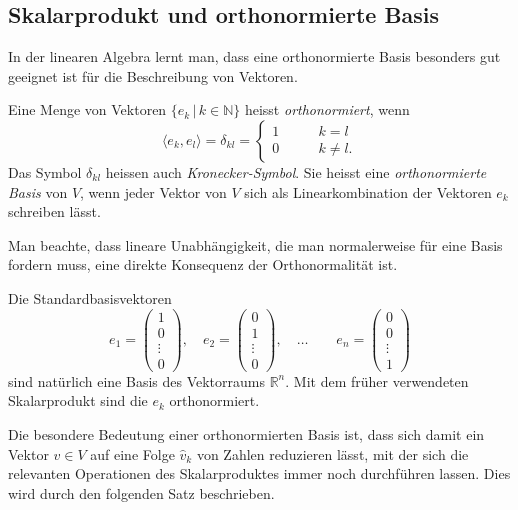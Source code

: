 \subsection{Skalarprodukt und orthonormierte Basis}
In der linearen Algebra lernt man, dass eine orthonormierte Basis besonders
gut geeignet ist für die Beschreibung von Vektoren.

\begin{definition}
Eine Menge von Vektoren $\{e_k\,|\, k\in\mathbb N\}$ heisst {\em orthonormiert},
%
wenn
\[
\langle e_k,e_l\rangle
=
\delta_{kl}
=
\begin{cases}
1 &\qquad k=l\\
0 &\qquad k\ne l.
\end{cases}
\]
Das Symbol $\delta_{kl}$ heissen auch {\em Kronecker-Symbol}.
%
%
%
Sie heisst eine {\em orthonormierte Basis} von $V$, wenn jeder Vektor
von $V$ sich als
%
%
Linearkombination der Vektoren $e_k$ schreiben lässt.
\end{definition}

Man beachte, dass lineare Unabhängigkeit, die man normalerweise für eine
Basis fordern muss, eine direkte Konsequenz der Orthonormalität ist.

Die Standardbasisvektoren
\[
e_1 = \begin{pmatrix}1\\0\\\vdots\\0\end{pmatrix},\quad
e_2 = \begin{pmatrix}0\\1\\\vdots\\0\end{pmatrix},\quad
\dots
\qquad
e_n = \begin{pmatrix}0\\0\\\vdots\\1\end{pmatrix}
\]
sind natürlich eine Basis des Vektorraums $\mathbb R^n$.
Mit dem früher verwendeten Skalarprodukt sind die $e_k$ orthonormiert.

Die besondere Bedeutung einer orthonormierten Basis ist, dass sich damit
ein Vektor $v\in V$ auf eine Folge $\hat{v}_k$ von Zahlen reduzieren 
lässt, mit der sich die relevanten Operationen des Skalarproduktes
immer noch durchführen lassen.
Dies wird durch den folgenden Satz beschrieben.

